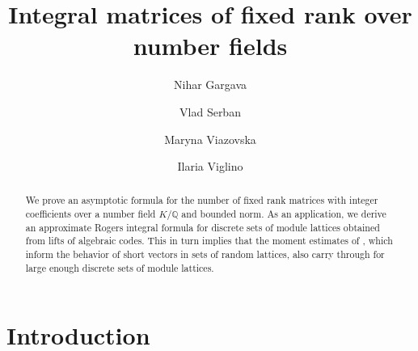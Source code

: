 \documentclass{amsart}
\theoremstyle{definition}
\theoremstyle{remark}
\begin{document}
\title{Integral matrices of fixed rank over number fields}
\author[N. Gargava]{Nihar Gargava}
\author[V. Serban]{Vlad Serban}
\author[M. Viazovska]{Maryna Viazovska}
\author[I. Viglino]{Ilaria Viglino}

\address{N. Gargava, Orsay Instute of Mathematics, Paris-Saclay University, France}
\address{V. Serban, Department of Mathematics, New College of Florida, U.S.A.}
\address{M. Viazovska, Section of Mathematics, EPFL, Switzerland}
\address{I. Viglino, Section of Mathematics, EPFL, Switzerland}



\begin{abstract}
    We prove an asymptotic formula for the number of fixed rank matrices with integer coefficients over a number field $K/\mathbb{Q}$ and bounded norm. As an application, we derive an approximate Rogers integral formula for discrete sets of module lattices obtained from lifts of algebraic codes. This in turn implies that the moment estimates of \cite{GSV23},{ which inform the behavior of short vectors in sets of random lattices, }also carry through for large enough discrete sets of module lattices. %
\end{abstract}
\maketitle

\section{Introduction}
\label{se:intro}
\end{document}
